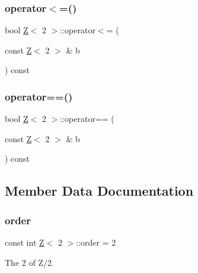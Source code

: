 \subsubsection{\texorpdfstring{operator$<$=()}{operator<=()}}
{\footnotesize\ttfamily bool \hyperlink{classZ}{Z}$<$ 2 $>$\+::operator$<$= (\begin{DoxyParamCaption}\item[{const \hyperlink{classZ}{Z}$<$ 2 $>$ \&}]{b }\end{DoxyParamCaption}) const\hspace{0.3cm}{\ttfamily [inline]}}

\mbox{\label{classZ_3_012_01_4_a98508d39c9695bdda292044170ef5718}} 
\subsubsection{\texorpdfstring{operator==()}{operator==()}}
{\footnotesize\ttfamily bool \hyperlink{classZ}{Z}$<$ 2 $>$\+::operator== (\begin{DoxyParamCaption}\item[{const \hyperlink{classZ}{Z}$<$ 2 $>$ \&}]{b }\end{DoxyParamCaption}) const\hspace{0.3cm}{\ttfamily [inline]}}



\subsection{Member Data Documentation}
\mbox{\label{classZ_3_012_01_4_a113854b6a1c2fec88ed352c117515c0e}} 
\subsubsection{\texorpdfstring{order}{order}}
{\footnotesize\ttfamily const int \hyperlink{classZ}{Z}$<$ 2 $>$\+::order = 2\hspace{0.3cm}{\ttfamily [static]}}



The 2 of Z/2. 

\mbox{\label{classZ_3_012_01_4_ae753e180f5d8aa55370a497e2c86fbb8}} 
